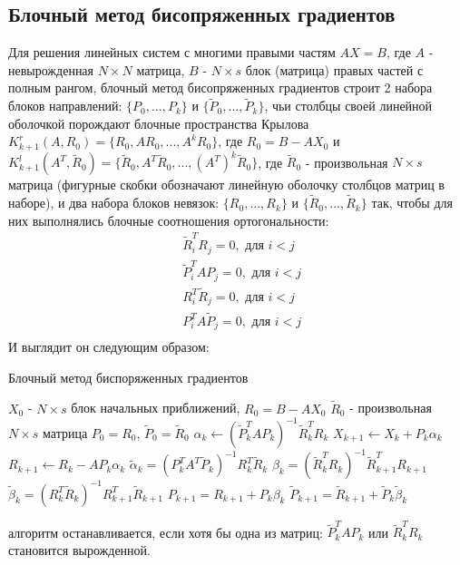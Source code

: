 \subsection[Блочный метод бисопряженных градиентов]{Блочный метод бисопряженных градиентов \cite{OLEARY1980293}}
Для решения линейных систем с многими правыми частям $AX=B$, где $A$ - невырожденная $N \times N$ матрица,
$B$ - $N \times s$ блок (матрица) правых частей с полным рангом,  
блочный метод бисопряженных градиентов строит 2 набора блоков направлений:
$\{ P_0, ... , P_k \}$ и $\{ \tilde{P}_0, ... , \tilde{P}_k \}$, чьи столбцы своей линейной оболочкой
порождают блочные пространства Крылова $K^r_{k+1}(A,R_0) = \{R_0,A R_0, ... ,A^k R_0\}$, где $R_0 = B - A X_0$ и
 $K^l_{k+1}(A^T,\tilde{R}_0) = \{\tilde{R}_0,A^T \tilde{R}_0, ... ,(A^T)^k \tilde{R}_0\}$, где $\tilde{R}_0$ - 
 произвольная $N \times s$ матрица (фигурные скобки обозначают линейную оболочку столбцов матриц в наборе), 
и два набора блоков невязок: $\{R_0, ... , R_k\}$ и $\{\tilde{R}_0, ... , \tilde{R}_k\}$ так, чтобы для них выполнялись 
блочные соотношения ортогональности:
\begin{align}
    &\tilde{R}_i^T R_j = 0, \text{ для } i < j \label{eq:bbcgorth1}\\
    &\tilde{P}_i^T A P_j = 0, \text{ для } i < j \label{eq:bbcgorth2}\\
    &R_i^T \tilde{R}_j = 0, \text{ для } i < j \label{eq:bbcgorth3}\\
    &P_i^T A \tilde{P}_j = 0, \text{ для } i < j \label{eq:bbcgorth4}\\
\end{align}
И выглядит он следующим образом:
\begin{algorithm}
    \caption{Блочный метод биспоряженных градиентов}
    \begin{algorithmic}
        \State $X_0$ - $N \times s$ блок начальных приближений, $R_0 = B - AX_0$
        \State $\tilde{R}_0$ - произвольная $ N\times s $ матрица
        \State $P_0 = R_0$, $\tilde{P}_0 = \tilde{R}_0$
            \State $\alpha_k \gets (\tilde{P}_k^T A P_k)^{-1} \tilde{R}_k^T R_k$
            \State $X_{k+1} \gets X_k + P_k \alpha_k$
            \State $R_{k+1} \gets R_k - A P_k \alpha_k$
            \State $\tilde{\alpha}_k = (P_k^TA^T \tilde{P}_k)^{-1}R_k^T \tilde{R}_k$
            \State $\beta_k = (\tilde{R}_k^T R_k)^{-1} \tilde{R}_{k+1}^T R_{k+1}$
            \State $\tilde{\beta}_k = (R_k^T \tilde{R}_k)^{-1} R_{k+1}^T \tilde{R}_{k+1}$
            \State $P_{k+1} = R_{k+1} + P_k \beta_k$
            \State $\tilde{P}_{k+1} = \tilde{R}_{k+1} + \tilde{P}_k \tilde{\beta}_k$
        \EndFor 
    \end{algorithmic}
\end{algorithm}
алгоритм останавливается, если хотя бы одна из матриц: $\tilde{P}_k^T A P_k$ или $\tilde{R}_k^T R_k$ становится 
вырожденной. 

